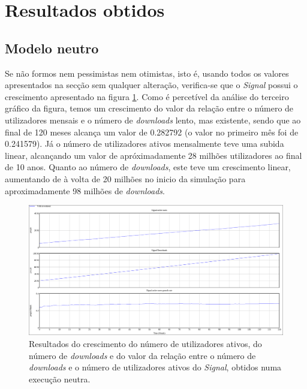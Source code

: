 \section{Resultados obtidos}
\label{sec:results}

\subsection{Modelo neutro}
Se não formos nem pessimistas nem otimistas, isto é, usando todos os valores apresentados na secção \label{sec:model} sem qualquer alteração, verifica-se que o \textit{Signal} possui o crescimento apresentado na figura \ref{model:base_signal_model}. Como é percetível da análise do terceiro gráfico da figura, temos um crescimento do valor da relação entre o número de utilizadores mensais e o número de \textit{downloads} lento, mas existente, sendo que ao final de 120 meses alcança um valor de 0.282792 (o valor no primeiro mês foi de 0.241579). Já o número de utilizadores ativos mensalmente teve uma subida linear, alcançando um valor de apróximadamente 28 milhões utilizadores ao final de 10 anos. Quanto ao número de \textit{downloads}, este teve um crescimento linear, aumentando de à volta de 20 milhões no inicio da simulação para aproximadamente 98 milhões de \textit{downloads}.

\begin{figure}[H]
   \begin{center}
       \includegraphics[width=17cm]{img/neutral_model_signal.png}
       \caption{Resultados do crescimento do número de utilizadores ativos, do número de \textit{downloads} e do valor da relação entre o número de \textit{downloads} e o número de utilizadores ativos do \textit{Signal}, obtidos numa execução neutra.}
       \label{model:base_signal_model}
   \end{center}
\end{figure}

